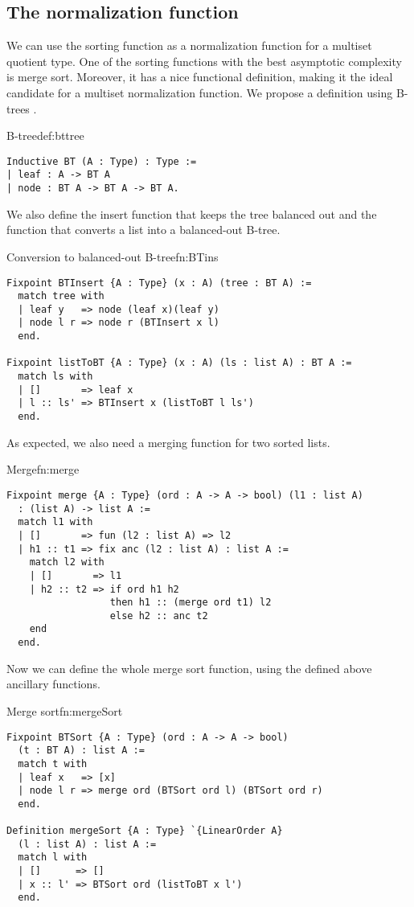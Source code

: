 \subsection{The normalization function}
We can use the sorting function as a normalization function for a multiset quotient type. One of the sorting functions with the best asymptotic complexity is merge sort. Moreover, it has a nice functional definition, making it the ideal candidate for a multiset normalization function. We propose a definition using B-trees \cite{Btree}.
\begin{defi}{B-tree}{def:bttree}
\begin{verbatim}
Inductive BT (A : Type) : Type :=
| leaf : A -> BT A
| node : BT A -> BT A -> BT A.
\end{verbatim}
\end{defi}
We also define the insert function that keeps the tree balanced out and the function that converts a list into a balanced-out B-tree.
\begin{func}{Conversion to balanced-out B-tree}{fn:BTins}
\begin{verbatim}
Fixpoint BTInsert {A : Type} (x : A) (tree : BT A) :=
  match tree with
  | leaf y   => node (leaf x)(leaf y)
  | node l r => node r (BTInsert x l)
  end.

Fixpoint listToBT {A : Type} (x : A) (ls : list A) : BT A :=
  match ls with
  | []       => leaf x
  | l :: ls' => BTInsert x (listToBT l ls')
  end.
\end{verbatim}
\end{func}
As expected, we also need a merging function for two sorted lists.
\begin{func}{Merge}{fn:merge}
\begin{verbatim}
Fixpoint merge {A : Type} (ord : A -> A -> bool) (l1 : list A) 
  : (list A) -> list A :=
  match l1 with
  | []       => fun (l2 : list A) => l2
  | h1 :: t1 => fix anc (l2 : list A) : list A :=
    match l2 with
    | []       => l1
    | h2 :: t2 => if ord h1 h2 
                  then h1 :: (merge ord t1) l2
                  else h2 :: anc t2
    end
  end.
\end{verbatim}
\end{func}
Now we can define the whole merge sort function, using the defined above ancillary functions.
\begin{func}{Merge sort}{fn:mergeSort}
\begin{verbatim}
Fixpoint BTSort {A : Type} (ord : A -> A -> bool) 
  (t : BT A) : list A :=
  match t with
  | leaf x   => [x]
  | node l r => merge ord (BTSort ord l) (BTSort ord r)
  end. 

Definition mergeSort {A : Type} `{LinearOrder A}
  (l : list A) : list A :=
  match l with
  | []      => []
  | x :: l' => BTSort ord (listToBT x l')
  end.
\end{verbatim}
\end{func}
